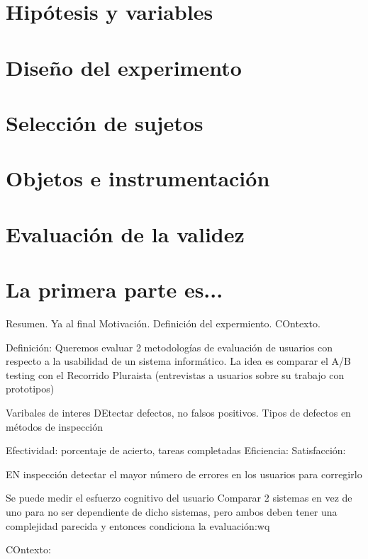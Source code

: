 \documentclass[a4paper,12pt]{book}
\begin{document}
\section{Hipótesis y variables}

\section{Diseño del experimento}

\section{Selección de sujetos}

\section{Objetos e instrumentación}

\section{Evaluación de la validez}





\section{La primera parte es...}
Resumen. Ya al final
Motivación. Definición del expermiento. COntexto. 

Definición: Queremos evaluar 2 metodologías de evaluación de usuarios con respecto a la usabilidad de un sistema informático. La idea es comparar el A/B testing con el Recorrido Pluraista (entrevistas a usuarios sobre su trabajo con prototipos)

Varibales de interes
DEtectar defectos, no falsos positivos. Tipos de defectos en métodos de inspección 

Efectividad: porcentaje de acierto, tareas completadas
Eficiencia:
Satisfacción:

EN inspección detectar el mayor número de errores en los usuarios para corregirlo

Se puede medir el esfuerzo cognitivo del usuario
Comparar 2 sistemas en vez de uno para no ser dependiente de dicho sistemas, pero ambos deben tener una complejidad parecida y entonces condiciona la evaluación:wq


COntexto: 
\end{document}
